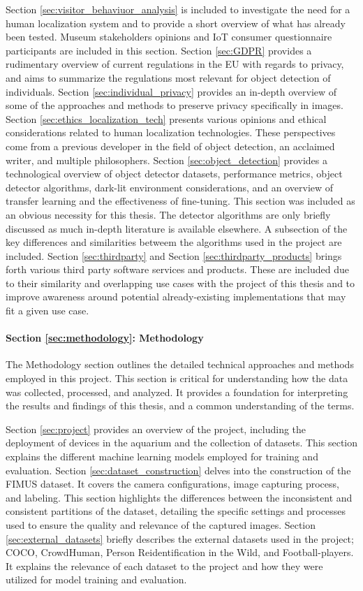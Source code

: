 Section \ref{sec:visitor_behaviuor_analysis} is included to investigate the need for a human localization system and to provide a short overview of what has already been tested. Museum stakeholders opinions and IoT consumer questionnaire participants are included in this section. Section \ref{sec:GDPR} provides a rudimentary overview of current regulations in the EU with regards to privacy, and aims to summarize the regulations most relevant for object detection of individuals. Section \ref{sec:individual_privacy} provides an in-depth overview of some of the approaches and methods to preserve privacy specifically in images. Section \ref{sec:ethics_localization_tech} presents various opinions and ethical considerations related to human localization technologies. These perspectives come from a previous developer in the field of object detection, an acclaimed writer, and multiple philosophers. Section \ref{sec:object_detection} provides a technological overview of object detector datasets, performance metrics, object detector algorithms, dark-lit environment considerations, and an overview of transfer learning and the effectiveness of fine-tuning. This section was included as an obvious necessity for this thesis. The detector algorithms are only briefly discussed as much in-depth literature is available elsewhere. A subsection of the key differences and similarities betweem the algorithms used in the project are included. Section \ref{sec:thirdparty} and Section \ref{sec:thirdparty_products} brings forth various third party software services and products. These are included due to their similarity and overlapping use cases with the project of this thesis and to improve awareness around potential already-existing implementations that may fit a given use case. 

\paragraph{Section \ref{sec:methodology}: Methodology}
The Methodology section outlines the detailed technical approaches and methods employed in this project. This section is critical for understanding how the data was collected, processed, and analyzed. It provides a foundation for interpreting the results and findings of this thesis, and a common understanding of the terms.

Section \ref{sec:project} provides an overview of the project, including the deployment of devices in the aquarium and the collection of datasets. This section explains the different machine learning models employed for training and evaluation. Section \ref{sec:dataset_construction} delves into the construction of the FIMUS dataset. It covers the camera configurations, image capturing process, and labeling. This section highlights the differences between the inconsistent and consistent partitions of the dataset, detailing the specific settings and processes used to ensure the quality and relevance of the captured images. Section \ref{sec:external_datasets} briefly describes the external datasets used in the project; COCO, CrowdHuman, Person Reidentification in the Wild, and Football-players. It explains the relevance of each dataset to the project and how they were utilized for model training and evaluation.

